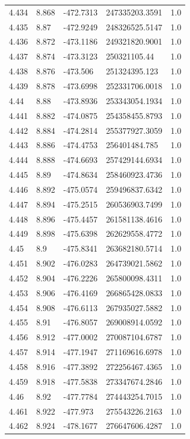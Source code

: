 \begin{tabular}{lllll}
4.434 & 8.868 & -472.7313 & 247335203.3591 & 1.0 \\
4.435 & 8.87 & -472.9249 & 248326525.5147 & 1.0 \\
4.436 & 8.872 & -473.1186 & 249321820.9001 & 1.0 \\
4.437 & 8.874 & -473.3123 & 250321105.44 & 1.0 \\
4.438 & 8.876 & -473.506 & 251324395.123 & 1.0 \\
4.439 & 8.878 & -473.6998 & 252331706.0018 & 1.0 \\
4.44 & 8.88 & -473.8936 & 253343054.1934 & 1.0 \\
4.441 & 8.882 & -474.0875 & 254358455.8793 & 1.0 \\
4.442 & 8.884 & -474.2814 & 255377927.3059 & 1.0 \\
4.443 & 8.886 & -474.4753 & 256401484.785 & 1.0 \\
4.444 & 8.888 & -474.6693 & 257429144.6934 & 1.0 \\
4.445 & 8.89 & -474.8634 & 258460923.4736 & 1.0 \\
4.446 & 8.892 & -475.0574 & 259496837.6342 & 1.0 \\
4.447 & 8.894 & -475.2515 & 260536903.7499 & 1.0 \\
4.448 & 8.896 & -475.4457 & 261581138.4616 & 1.0 \\
4.449 & 8.898 & -475.6398 & 262629558.4772 & 1.0 \\
4.45 & 8.9 & -475.8341 & 263682180.5714 & 1.0 \\
4.451 & 8.902 & -476.0283 & 264739021.5862 & 1.0 \\
4.452 & 8.904 & -476.2226 & 265800098.4311 & 1.0 \\
4.453 & 8.906 & -476.4169 & 266865428.0833 & 1.0 \\
4.454 & 8.908 & -476.6113 & 267935027.5882 & 1.0 \\
4.455 & 8.91 & -476.8057 & 269008914.0592 & 1.0 \\
4.456 & 8.912 & -477.0002 & 270087104.6787 & 1.0 \\
4.457 & 8.914 & -477.1947 & 271169616.6978 & 1.0 \\
4.458 & 8.916 & -477.3892 & 272256467.4365 & 1.0 \\
4.459 & 8.918 & -477.5838 & 273347674.2846 & 1.0 \\
4.46 & 8.92 & -477.7784 & 274443254.7015 & 1.0 \\
4.461 & 8.922 & -477.973 & 275543226.2163 & 1.0 \\
4.462 & 8.924 & -478.1677 & 276647606.4287 & 1.0 \\

\end{tabular}
